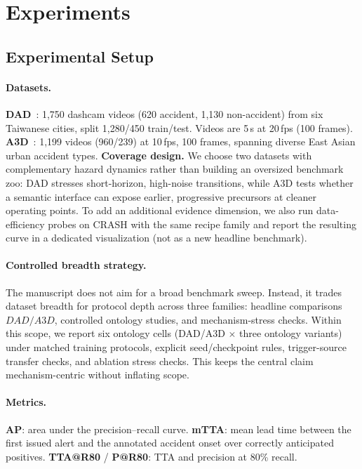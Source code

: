 \section{Experiments}
\label{sec:experiments}

\subsection{Experimental Setup}

\paragraph{Datasets.}
\textbf{DAD}~\citep{ref4}: 1,750 dashcam videos (620 accident,
1,130 non-accident) from six Taiwanese cities, split 1,280/450
train/test. Videos are 5\,s at 20\,fps (100 frames).
\textbf{A3D}~\citep{liao2024crash}: 1,199 videos (960/239) at 10\,fps,
100 frames, spanning diverse East Asian urban accident types.
\textbf{Coverage design.}
We choose two datasets with complementary hazard dynamics rather than building
an oversized benchmark zoo: DAD stresses short-horizon, high-noise transitions,
while A3D tests whether a semantic interface can expose earlier, progressive
precursors at cleaner operating points.
To add an additional evidence dimension, we also run data-efficiency probes on
CRASH with the same recipe family and report the resulting curve in a dedicated
visualization (not as a new headline benchmark).

\paragraph{Controlled breadth strategy.}
The manuscript does not aim for a broad benchmark sweep. Instead, it trades
dataset breadth for protocol depth across three families: headline comparisons
\(DAD/A3D\), controlled ontology studies, and mechanism-stress checks.
Within this scope, we report six ontology cells (DAD/A3D $\times$ three ontology
variants) under matched training protocols, explicit seed/checkpoint rules, trigger-source
transfer checks, and ablation stress checks. This keeps the central claim
mechanism-centric without inflating scope.

\paragraph{Metrics.}
\textbf{AP}: area under the precision--recall curve.
\textbf{mTTA}: mean lead time between the first issued alert and the annotated
accident onset over correctly anticipated positives.
\textbf{TTA@R80} / \textbf{P@R80}: TTA and precision at 80\% recall.

